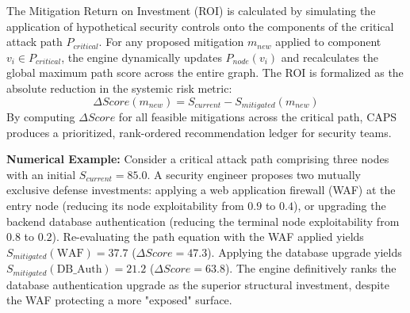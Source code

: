 The Mitigation Return on Investment (ROI) is calculated by simulating the application of hypothetical security controls onto the components of the critical attack path $P_{critical}$. For any proposed mitigation $m_{new}$ applied to component $v_i \in P_{critical}$, the engine dynamically updates $P_{node}(v_i)$ and recalculates the global maximum path score across the entire graph. The ROI is formalized as the absolute reduction in the systemic risk metric:
\begin{equation}
\Delta Score(m_{new}) = S_{current} - S_{mitigated}(m_{new})
\end{equation}
By computing $\Delta Score$ for all feasible mitigations across the critical path, CAPS produces a prioritized, rank-ordered recommendation ledger for security teams. 

\textbf{Numerical Example:} Consider a critical attack path comprising three nodes with an initial $S_{current} = 85.0$. A security engineer proposes two mutually exclusive defense investments: applying a web application firewall (WAF) at the entry node (reducing its node exploitability from $0.9$ to $0.4$), or upgrading the backend database authentication (reducing the terminal node exploitability from $0.8$ to $0.2$). Re-evaluating the path equation with the WAF applied yields $S_{mitigated}(\text{WAF}) = 37.7$ ($\Delta Score = 47.3$). Applying the database upgrade yields $S_{mitigated}(\text{DB\_Auth}) = 21.2$ ($\Delta Score = 63.8$). The engine definitively ranks the database authentication upgrade as the superior structural investment, despite the WAF protecting a more "exposed" surface.
